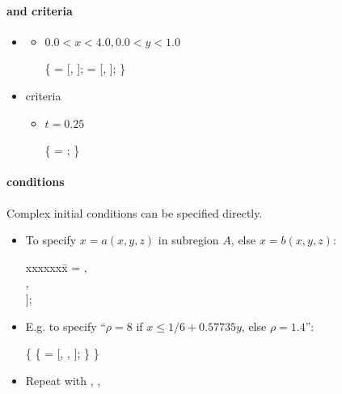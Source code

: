 \begin{frame}[fragile] 
\secframetitle{\ssDoubleMach}
\framesubtitle{ and  criteria}
\begin{itemize}
\item {}

\begin{itemize}
\item $0.0 < x < 4.0, 0.0 < y < 1.0$
\begin{semiverbatim}
 \{ 
    = [, ];
    = [, ];
\} 
\end{semiverbatim}
\end{itemize}
%
\item {} criteria
\begin{itemize}
%
\item $t=0.25$
%
\begin{semiverbatim}
 \{  = ; \} 
\end{semiverbatim}
%
\end{itemize}
\end{itemize}
\end{frame}


 \begin{frame}[fragile] 
 \secframetitle{\ssDoubleMach}
 \framesubtitle{ conditions}
\footnotesize
Complex initial conditions can be specified directly.

 \begin{itemize}
 \item To specify $x = a(x,y,z)$ in subregion $A$, else $x = b(x,y,z)$:
 \begin{tabbing}
 xxxxxxx\=\kill
{} = \code{[} \>  , \\
\>                          , \\
\>                           ];
 \end{tabbing}
 \item E.g. to specify ``$\rho = 8$ if $x \le 1/6 + 0.57735 y$, else $\rho = 1.4$'':
\begin{semiverbatim}
 \{
     \{
         = [, , 
                 ];  \}
\}
\end{semiverbatim}
\item Repeat with , , 
 \end{itemize}
\end{frame}

